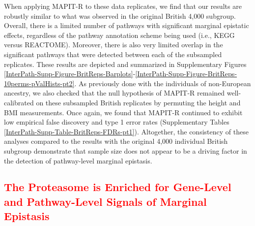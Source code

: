 \documentclass[10pt]{article}
\begin{document}
When applying MAPIT-R to these data replicates, we find that our results are robustly similar to what was observed in the original British 4,000 subgroup. Overall, there is a limited number of pathways with significant marginal epistatic effects, regardless of the pathway annotation scheme being used (i.e., KEGG versus REACTOME). Moreover, there is also very limited overlap in the significant pathways that were detected between each of the subsampled replicates. These results are depicted and summarized in Supplementary Figures \ref{InterPath-Supp-Figure-BritReps-Barplots}-\ref{InterPath-Supp-Figure-BritReps-10perms-pValHists-pt2}. As previously done with the individuals of non-European ancestry, we also checked that the null hypothesis of MAPIT-R remained well-calibrated on these subsampled British replicates by permuting the height and BMI measurements. Once again, we found that MAPIT-R continued to exhibit low empirical false discovery and type 1 error rates (Supplementary Tables \ref{InterPath-Supp-Table-BritReps-FDRs-pt1}). Altogether, the consistency of these analyses compared to the results with the original 4,000 individual British subgroup demonstrate that sample size does not appear to be a driving factor in the detection of pathway-level marginal epistasis.

\subsection*{\textcolor{red}{The Proteasome is Enriched for Gene-Level and Pathway-Level Signals of Marginal Epistasis}}
\end{document}
